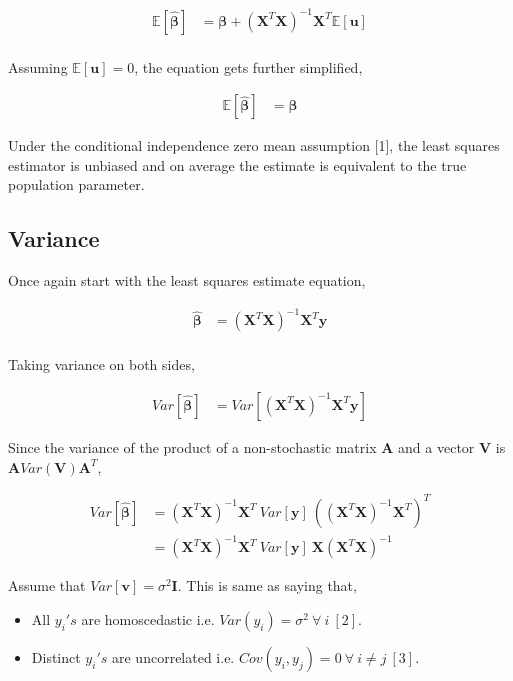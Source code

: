 \documentclass[11pt, a4paper]{article}
\begin{document}
\begin{align*}
	\mathbb{E}[\hat{\boldsymbol{\beta}}] & = \boldsymbol{\beta} + (\mathbf{X}^T\mathbf{X})^{-1}\mathbf{X}^T\mathbb{E}[\mathbf{u}] \\
\end{align*} 

Assuming $\mathbb{E}[\mathbf{u}] = 0$, the equation gets further simplified,

\begin{align*}
	\mathbb{E}[\hat{\boldsymbol{\beta}}] & = \boldsymbol{\beta} 
\end{align*}

Under the conditional independence zero mean assumption [1], the least squares estimator is unbiased and on average the estimate is equivalent to the true population parameter.

\subsection{Variance} 

Once again start with the least squares estimate equation,

\begin{align*}
	\boldsymbol{\hat{\beta}} & = (\mathbf{X}^T\mathbf{X})^{-1}\mathbf{X}^T\mathbf{y} \\
\end{align*}

Taking variance on both sides,

\begin{align*}
	Var[\boldsymbol{\hat{\beta}}] & = Var[(\mathbf{X}^T\mathbf{X})^{-1}\mathbf{X}^T\mathbf{y}] 
\end{align*}

Since the variance of the product of a non-stochastic matrix $\mathbf{A}$ and a vector $\mathbf{V}$ is $\mathbf{A}Var(\mathbf{V})\mathbf{A}^T$,

\begin{align*}
	Var[\boldsymbol{\hat{\beta}}] & = (\mathbf{X}^T\mathbf{X})^{-1}\mathbf{X}^T\ Var[\mathbf{y}]\ ((\mathbf{X}^T\mathbf{X})^{-1}\mathbf{X}^T)^T \\
	                              & = (\mathbf{X}^T\mathbf{X})^{-1}\mathbf{X}^T\ Var[\mathbf{y}]\  \mathbf{X}(\mathbf{X}^T\mathbf{X})^{-1}      
\end{align*} 

Assume that $Var[\mathbf{v}] = \sigma^2\mathbf{I}$. This is same as saying that,

\begin{itemize}
	\item All $y_i's$ are  homoscedastic i.e. $Var(y_i) = \sigma^2 \ \forall\ i\ [2]$.
	\item Distinct $y_i's$ are uncorrelated i.e. $Cov(y_i, y_j) = 0\  \forall\ i \neq j\ [3]$.
\end{itemize}
\end{document}
